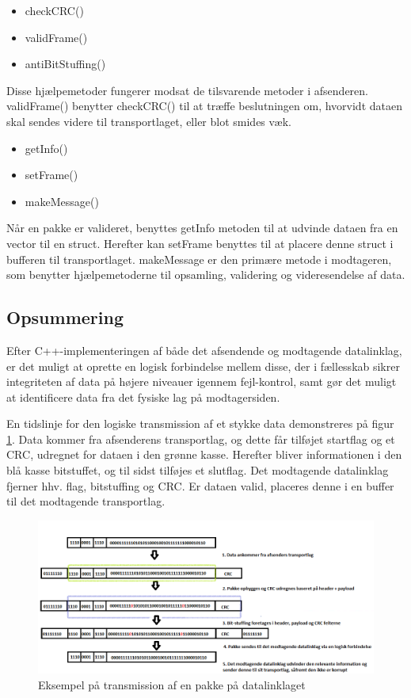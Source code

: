 \begin{itemize}[noitemsep]
  \item checkCRC()
  \item validFrame()
  \item antiBitStuffing()
  \end{itemize}
Disse hjælpemetoder fungerer modsat de tilsvarende metoder i afsenderen. validFrame() benytter checkCRC() til at træffe beslutningen om, hvorvidt dataen skal sendes videre til transportlaget, eller blot smides væk.

\begin{itemize}[noitemsep]
  \item getInfo()
  \item setFrame()
  \item makeMessage()
  \end{itemize}
  
Når en pakke er valideret, benyttes getInfo metoden til at udvinde dataen fra en vector til en struct. Herefter kan setFrame benyttes til at placere denne struct i bufferen til transportlaget.
makeMessage er den primære metode i modtageren, som benytter hjælpemetoderne til opsamling, validering og videresendelse af data.

\subsection{Opsummering}
Efter C++-implementeringen af både det afsendende og modtagende datalinklag, er det muligt at oprette en logisk forbindelse mellem disse, der i fællesskab sikrer integriteten af data på højere niveauer igennem fejl-kontrol, samt gør det muligt at identificere data fra det fysiske lag på modtagersiden.

En tidslinje for den logiske transmission af et stykke data demonstreres på figur \ref{fig:DataLinkExample}. Data kommer fra afsenderens transportlag, og dette får tilføjet startflag og et CRC, udregnet for dataen i den grønne kasse. Herefter bliver informationen i den blå kasse bitstuffet, og til sidst tilføjes et slutflag. Det modtagende datalinklag fjerner hhv. flag, bitstuffing og CRC. Er dataen valid, placeres denne i en buffer til det modtagende transportlag.

\begin{figure}[h!]
\centering
\includegraphics[scale=0.6]{Billeder/DataLinkExample.PNG}
\caption{Eksempel på transmission af en pakke på datalinklaget}
\label{fig:DataLinkExample}
\end{figure}